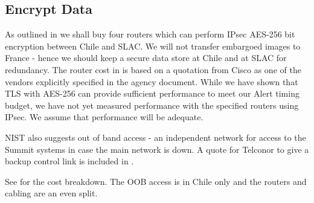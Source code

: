 \subsection{Encrypt Data} \label{sec:1encrypt}

As outlined in   we shall buy four routers which can perform \gls{IPsec} AES-256 bit encryption between Chile and SLAC.
We will not transfer embargoed images to France - hence we should keep a secure data store at Chile and at \gls{SLAC} for redundancy.
The router cost in   is based on a quotation from Cisco as one of the vendors explicitly specified in the agency document.
While we have shown that \gls{TLS} with AES-256 can provide sufficient performance to meet our Alert timing budget, we have not yet measured performance with the specified routers using IPsec.
We assume that performance will be adequate.

NIST also suggests out of band access - an independent network for access to the \gls{Summit} systems in case the main network is down.
A quote for Telconor to give a backup control link is included in .

See  for the cost breakdown.  The \gls{OOB} access is in Chile only and the routers and cabling are an even split.



